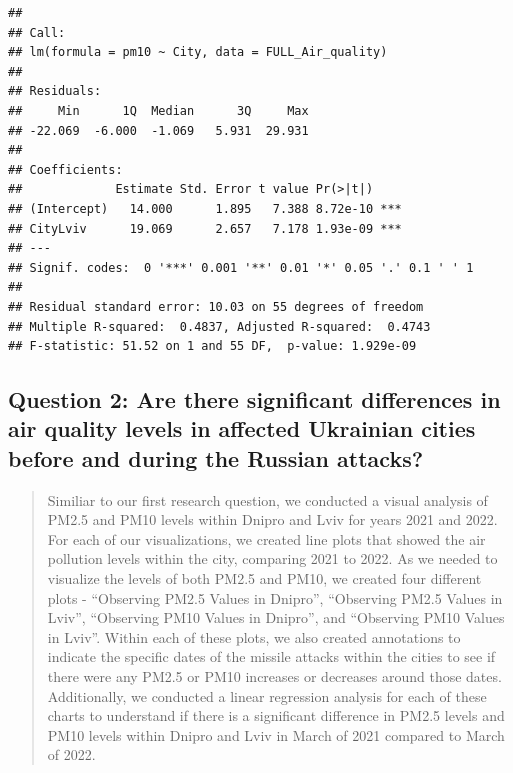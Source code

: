 \documentclass[
  12pt,
]{article}
\begin{document}
\begin{verbatim}
## 
## Call:
## lm(formula = pm10 ~ City, data = FULL_Air_quality)
## 
## Residuals:
##     Min      1Q  Median      3Q     Max 
## -22.069  -6.000  -1.069   5.931  29.931 
## 
## Coefficients:
##             Estimate Std. Error t value Pr(>|t|)    
## (Intercept)   14.000      1.895   7.388 8.72e-10 ***
## CityLviv      19.069      2.657   7.178 1.93e-09 ***
## ---
## Signif. codes:  0 '***' 0.001 '**' 0.01 '*' 0.05 '.' 0.1 ' ' 1
## 
## Residual standard error: 10.03 on 55 degrees of freedom
## Multiple R-squared:  0.4837, Adjusted R-squared:  0.4743 
## F-statistic: 51.52 on 1 and 55 DF,  p-value: 1.929e-09
\end{verbatim}

\hypertarget{question-2-are-there-significant-differences-in-air-quality-levels-in-affected-ukrainian-cities-before-and-during-the-russian-attacks}{%
\subsection{Question 2: Are there significant differences in air quality
levels in affected Ukrainian cities before and during the Russian
attacks?}\label{question-2-are-there-significant-differences-in-air-quality-levels-in-affected-ukrainian-cities-before-and-during-the-russian-attacks}}

\begin{quote}
Similiar to our first research question, we conducted a visual analysis
of PM2.5 and PM10 levels within Dnipro and Lviv for years 2021 and 2022.
For each of our visualizations, we created line plots that showed the
air pollution levels within the city, comparing 2021 to 2022. As we
needed to visualize the levels of both PM2.5 and PM10, we created four
different plots - ``Observing PM2.5 Values in Dnipro'', ``Observing
PM2.5 Values in Lviv'', ``Observing PM10 Values in Dnipro'', and
``Observing PM10 Values in Lviv''. Within each of these plots, we also
created annotations to indicate the specific dates of the missile
attacks within the cities to see if there were any PM2.5 or PM10
increases or decreases around those dates. Additionally, we conducted a
linear regression analysis for each of these charts to understand if
there is a significant difference in PM2.5 levels and PM10 levels within
Dnipro and Lviv in March of 2021 compared to March of 2022.\\
\end{quote}
\end{document}
